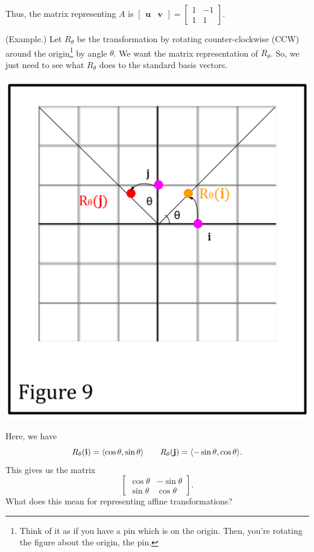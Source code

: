 \documentclass[letterpaper]{article}
\begin{document}
\begin{mdframed}[]
    Thus, the matrix representing $A$ is $\begin{bmatrix}
        \mathbf{u} & \mathbf{v}
    \end{bmatrix} = \begin{bmatrix}
        1 & -1 \\ 1 & 1
    \end{bmatrix}$.
\end{mdframed}

\begin{mdframed}[nobreak=true]
    (Example.) Let $R_{\theta}$ be the transformation by rotating counter-clockwise (CCW) around the origin\footnote{Think of it as if you have a pin which is on the origin. Then, you're rotating the figure about the origin, the pin.} by angle $\theta$. We want the matrix representation of $R_{\theta}$. So, we just need to see what $R_{\theta}$ does to the standard basis vectors. 
    \begin{center}
        \includegraphics[scale=0.4]{../assets/f7.png}
    \end{center}
    Here, we have 
    \[R_{\theta}(\mathbf{i}) = \langle \cos \theta, \sin \theta \rangle \qquad R_{\theta}(\mathbf{j}) = \langle -\sin \theta, \cos \theta \rangle.\]
    This gives us the matrix 
    \[\begin{bmatrix}
        \cos \theta & -\sin \theta \\ 
        \sin \theta & \cos \theta
    \end{bmatrix}.\]
    What does this mean for representing affine transformations? 
\end{mdframed}
\end{document}
